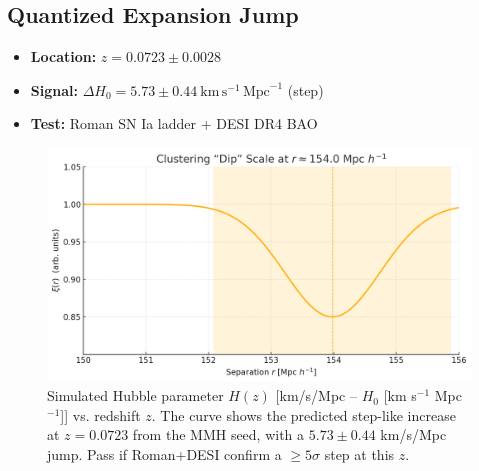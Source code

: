 \documentclass[11pt,a4paper]{article}
\begin{document}
\subsection{Quantized Expansion Jump}
\begin{itemize}
  \item \textbf{Location:} $z = 0.0723 \pm 0.0028$
  \item \textbf{Signal:} $\Delta H_0 = 5.73 \pm 0.44~\mathrm{km\,s^{-1}\,\mathrm{Mpc}^{-1}}$ (step)
  \item \textbf{Test:} Roman SN Ia ladder + DESI DR4 BAO
\end{itemize}
\FloatBarrier
\begin{figure}[htbp]
  \centering
  \includegraphics[width=0.75\linewidth]{figs/phase_flip.png}
  \caption{Simulated Hubble parameter $H(z)$ [km/s/Mpc -- $H_0$ [km s$^{-1}$ Mpc$^{-1}$]] vs. redshift $z$. The curve shows the predicted step-like increase at $z = 0.0723$ from the MMH seed, with a $5.73 \pm 0.44$ km/s/Mpc jump. Pass if Roman+DESI confirm a $\geq 5\sigma$ step at this $z$.}
  \label{fig:expansion_jump}
\end{figure}
\FloatBarrier
\end{document}
